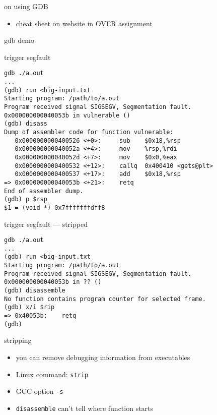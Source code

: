 
\begin{frame}{on using GDB}
    \begin{itemize}
    \item cheat sheet on website in OVER assignment
    \end{itemize}
\end{frame}

\begin{frame}{gdb demo}
\end{frame}

\begin{frame}[fragile,label=trigSeg]{trigger segfault}
\begin{Verbatim}[fontsize=\fontsize{10}{11}\selectfont]
gdb ./a.out
...
(gdb) run <big-input.txt
Starting program: /path/to/a.out 
Program received signal SIGSEGV, Segmentation fault.
0x000000000040053b in vulnerable ()
(gdb) disass
Dump of assembler code for function vulnerable:
   0x0000000000400526 <+0>:     sub    $0x18,%rsp
   0x000000000040052a <+4>:     mov    %rsp,%rdi
   0x000000000040052d <+7>:     mov    $0x0,%eax
   0x0000000000400532 <+12>:    callq  0x400410 <gets@plt>
   0x0000000000400537 <+17>:    add    $0x18,%rsp
=> 0x000000000040053b <+21>:    retq   
End of assembler dump.
(gdb) p $rsp 
$1 = (void *) 0x7fffffffdff8
\end{Verbatim}
\end{frame}

\begin{frame}[fragile,label=trigSegStripped]{trigger segfault --- stripped}
\begin{Verbatim}[fontsize=\fontsize{10}{11}\selectfont]
gdb ./a.out
...
(gdb) run <big-input.txt
Starting program: /path/to/a.out 
Program received signal SIGSEGV, Segmentation fault.
0x000000000040053b in ?? ()
(gdb) disassemble
No function contains program counter for selected frame.
(gdb) x/i $rip
=> 0x40053b:    retq   
(gdb)
\end{Verbatim}
\end{frame}

\begin{frame}{stripping}
\begin{itemize}
\item you can remove debugging information from executables
\item Linux command: \texttt{strip}
\item GCC option \texttt{-s}
\item \texttt{disassemble} can't tell where function starts
\end{itemize}
\end{frame}


